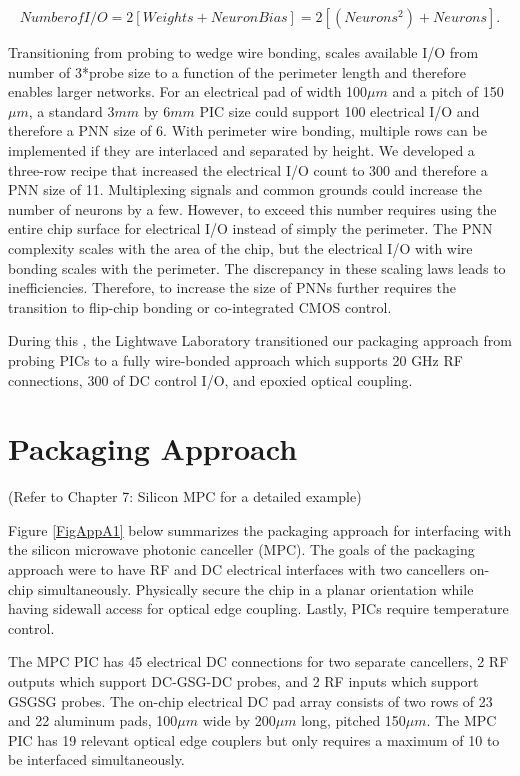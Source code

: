 \begin{equation}
    Number of I/O = 2[Weights + Neuron Bias] = 2[(Neurons^2) + Neurons].
    \label{eqn:IOcount}
\end{equation}

\qquad Transitioning from probing to wedge wire bonding, scales available I/O from number of 3*probe size to a function of the perimeter length and therefore enables larger networks. For an electrical pad of width 100$\mu m$ and a pitch of 150$\mu m$, a standard 3$mm$ by 6$mm$ PIC size could support 100 electrical I/O and therefore a PNN size of 6. With perimeter wire bonding, multiple rows can be implemented if they are interlaced and separated by height. We developed a three-row recipe that increased the electrical I/O count to 300 and therefore a PNN size of 11. Multiplexing signals and common grounds could increase the number of neurons by a few. However, to exceed this number requires using the entire chip surface for electrical I/O instead of simply the perimeter. The PNN complexity scales with the area of the chip, but the electrical I/O with wire bonding scales with the perimeter. The discrepancy in these scaling laws leads to inefficiencies. Therefore, to increase the size of PNNs further requires the transition to flip-chip bonding or co-integrated CMOS control.

\qquad During this , the Lightwave Laboratory transitioned our packaging approach from probing PICs to a fully wire-bonded approach which supports 20 GHz RF connections, 300 of DC control I/O, and epoxied optical coupling. 

\section{Packaging Approach}
(Refer to Chapter 7: Silicon MPC for a detailed example)

\qquad Figure \ref{FigAppA1} below summarizes the packaging approach for interfacing with the silicon microwave photonic canceller (MPC). The goals of the packaging approach were to have RF and DC electrical interfaces with two cancellers on-chip simultaneously. Physically secure the chip in a planar orientation while having sidewall access for optical edge coupling. Lastly, PICs require temperature control. 

\qquad The MPC PIC has 45 electrical DC connections for two separate cancellers, 2 RF outputs which support DC-GSG-DC probes, and 2 RF inputs which support GSGSG probes. The on-chip electrical DC pad array consists of two rows of 23 and 22 aluminum pads, 100$\mu m$ wide by 200$\mu m$ long, pitched 150$\mu m$. The MPC PIC has 19 relevant optical edge couplers but only requires a maximum of 10 to be interfaced simultaneously. 


